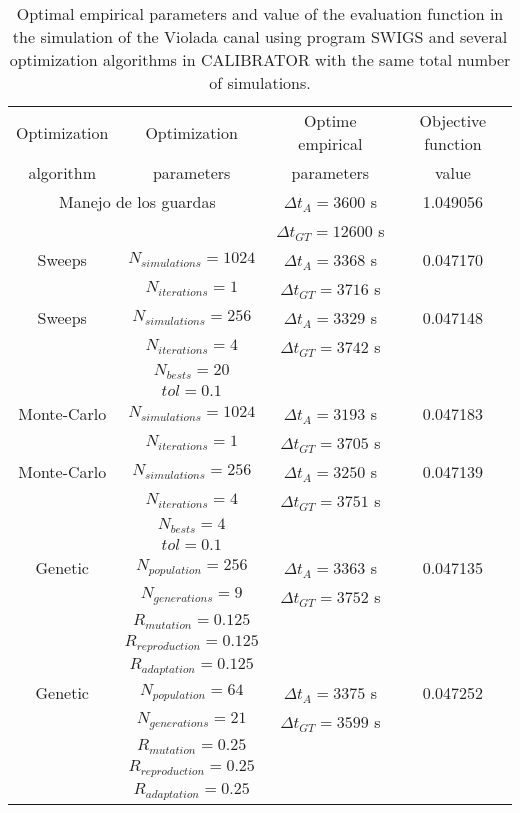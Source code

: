 \documentclass[review,authoryear]{elsarticle}
\newcommand{\TABLE}[5]
{
	\begin{table}[ht!]
		\centering
		\caption{#4.\label{#5}}
		#1
		\begin{tabular}{#2}
			#3
		\end{tabular}
	\end{table}
}
\begin{document}
\TABLE{\scriptsize}{cccc}
{
	Optimization & Optimization & Optime empirical & Objective function
	\\ algorithm & parameters & parameters & value
	\\ \hline
	\multicolumn{2}{c}{Manejo de los guardas} & $\Delta t_A=3600$ s & 1.049056
	\\ & & $\Delta t_{GT}=12600$ s
	\\ \hline
	Sweeps & $N_{simulations}=1024$ & $\Delta t_A=3368$ s & 0.047170
	\\ & $N_{iterations}=1$ & $\Delta t_{GT}=3716$ s
	\\ \hline
	Sweeps & $N_{simulations}=256$ & $\Delta t_A=3329$ s & 0.047148
	\\ & $N_{iterations}=4$ & $\Delta t_{GT}=3742$ s
	\\ & $N_{bests}=20$ &
	\\ & $tol=0.1$
	\\ \hline
	Monte-Carlo & $N_{simulations}=1024$ & $\Delta t_A=3193$ s & 0.047183
	\\ & $N_{iterations}=1$ & $\Delta t_{GT}=3705$ s
	\\ \hline
	Monte-Carlo & $N_{simulations}=256$ & $\Delta t_A=3250$ s & 0.047139
	\\ & $N_{iterations}=4$ & $\Delta t_{GT}=3751$ s
	\\ & $N_{bests}=4$
	\\ & $tol=0.1$
	\\ \hline
	Genetic & $N_{population}=256$ & $\Delta t_A=3363$ s & 0.047135
	\\ & $N_{generations}=9$ & $\Delta t_{GT}=3752$ s
	\\ & $R_{mutation}=0.125$
	\\ & $R_{reproduction}=0.125$
	\\ & $R_{adaptation}=0.125$
	\\ \hline
	Genetic & $N_{population}=64$ & $\Delta t_A=3375$ s & 0.047252
	\\ & $N_{generations}=21$ & $\Delta t_{GT}=3599$ s
	\\ & $R_{mutation}=0.25$
	\\ & $R_{reproduction}=0.25$
	\\ & $R_{adaptation}=0.25$
	\\ \hline
}{Optimal empirical parameters and value of the evaluation function in the simulation of the Violada canal using program SWIGS and several optimization algorithms in CALIBRATOR with the same total number of simulations}{TabSwigs}
\end{document}
